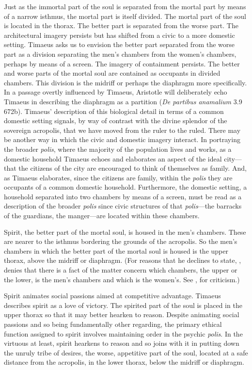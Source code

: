 Just as the immortal part of the soul is separated from the mortal part by means of a narrow isthmus, the mortal part is itself divided. The mortal part of the soul is located in the thorax. The better part is separated from the worse part. The architectural imagery persists but has shifted from a civic to a more domestic setting. Timaeus asks us to envision the better part separated from the worse part as a division separating the men's chambers from the women's chambers, perhaps by means of a screen. The imagery of containment persists. The better and worse parts of the mortal soul are contained as occupants in divided chambers. This division is the midriff or perhaps the diaphragm more specifically. In a passage overtly influenced by Timaeus, Aristotle will deliberately echo Timaeus in describing the diaphragm as a partition (\emph{De partibus anamalium} 3.9 672b). Timaeus' description of this biological detail in terms of a common domestic setting signals, by way of contrast with the divine splendor of the sovereign acropolis, that we have moved from the ruler to the ruled. There may be another way in which the civic and domestic imagery interact. In portraying the broader \emph{polis}, where the majority of the population lives and works, as a domestic household Timaeus echoes and elaborates an aspect of the ideal city---that the citizens of the city are encouraged to think of themselves as family. And, as Timaeus elaborates, since the citizens are family, within the \emph{polis} they are occupants of a common domestic household. Furthermore, the domestic setting, a household separated into two chambers by means of a screen, must be read as a description of the broader \emph{polis} since civic structures of that \emph{polis}---the barracks of the guardians, the manger---are located within these chambers.

Spirit, the better part of the mortal soul, is housed in the men's chambers. These are nearer to the isthmus bordering the grounds of the acropolis. So the men's chambers in which the better part of the mortal soul is housed is the upper thorax, above the midriff or diaphragm. (For reasons that he declines to state, \citealt[257 n13]{Archer-Hind:1888qd}, denies that there is a fact of the matter concern which chambers, the upper or the lower, is the men's chambers and which is the women's. See \citealt[501]{Taylor:1928qb}, for criticism.)

Spirit animates social passions aimed at competitive advantage. Timaeus describes spirit as a love of victory. The spirited part of the soul is placed in the upper thorax so that it may better hearken to reason. Despite animating social passions and so being fundamentally other regarding, the primary ethical function assigned to spirit involves maintaining order in the psychic \emph{polis}. In the virtuous at least, spirit hearkens to reason and so joins with it in putting down the unruly tribe of desires, the worse, appetitive part of the soul, located at a safe distance from the acropolis, in the lower thorax, below the midriff or diaphragm.

